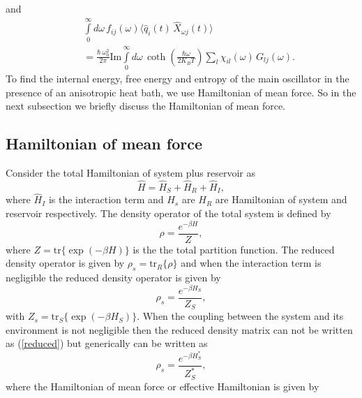 \documentclass[preprint,showpacs,showkeys,groupedaddress,superscriptaddress]{revtex4}
\begin{document}
and
\begin{eqnarray}
&& \int\limits_0^\infty d\omega\, f_{ij} (\omega )\langle \hat q_i (t)\,\hat X_{\omega j} (t) \rangle\nonumber\\
&& = \frac{\hbar \,\omega _0^2 }{2\pi}\mbox{Im} \int\limits_0^\infty d\omega\, \coth \left(\frac{\hbar \omega}{2K_B T} \right)\sum\limits_l \chi_{il} (\omega )\,G_{lj} (\omega ).
\end{eqnarray}
 To find the internal energy, free energy and entropy of the main oscillator in the presence of an anisotropic heat bath, we use Hamiltonian of mean force. So in the next subsection we briefly discuss the Hamiltonian of mean force.
\subsection{ Hamiltonian of mean force} \label{ Hamiltonian of mean force}
\noindent Consider the total Hamiltonian of system plus reservoir as
\begin{equation}
 \hat H=\hat H_S+\hat H_R +\hat H_I,
\end{equation}
where $\hat H_I$ is the interaction term and $H_s$ are $H_R$ are Hamiltonian of system and reservoir respectively. The density operator of the total system is defined by
\begin{equation}\label{density}
  \rho=\frac{e^{-\beta H}}{Z},
\end{equation}
where $Z=\mbox{tr} \{\exp (-\beta H)\}$ is the the total partition function. The reduced density operator is given by $\rho_s=\mbox{tr}_R \{\rho\}$ and when the interaction term is negligible the reduced density operator is given by
\begin{equation}\label{reduced}
  \rho_s=\frac{e^{-\beta H_S}}{Z_S},
\end{equation}
with $Z_s=\mbox{tr}_S \{\exp (-\beta H_S)\}$. When the coupling between the system and its environment is not negligible then the reduced density matrix can not be written as (\ref{reduced}) but generically can be written as
\begin{equation}\label{MFD}
  \rho_s=\frac{e^{-\beta H^*_S}}{Z^*_S},
\end{equation}
where the Hamiltonian of mean force or effective Hamiltonian is given by
\end{document}
